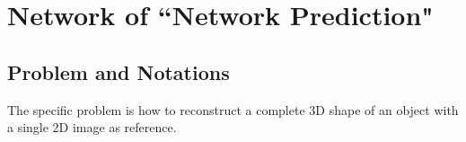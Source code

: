 \section{Network of ``Network Prediction"}
\subsection{Problem and Notations}
The specific problem is how to reconstruct a complete 3D shape of an object with a single 2D image as reference.  